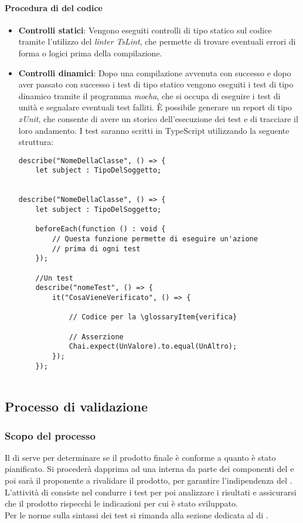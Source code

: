 \paragraph*{Procedura di  del codice}
\begin{itemize}
\item \textbf{Controlli statici}: Vengono eseguiti controlli di tipo statico sul codice tramite l'utilizzo del \textit{linter} \textit{TsLint}, che permette di trovare eventuali errori di forma o logici prima della compilazione.

\item \textbf{Controlli dinamici}: Dopo una compilazione avvenuta con successo e dopo aver passato con successo i test di tipo statico vengono eseguiti i test di tipo dinamico tramite il programma \textit{mocha}, che si occupa di eseguire i test di unità e segnalare eventuali test falliti. È possibile generare un report di tipo \textit{xUnit}, che consente di avere un storico dell'esecuzione dei test e di tracciare il loro andamento. I test saranno scritti in TypeScript utilizzando la seguente struttura:
\begin{verbatim}
describe("NomeDellaClasse", () => {
    let subject : TipoDelSoggetto;


describe("NomeDellaClasse", () => {
    let subject : TipoDelSoggetto;

    beforeEach(function () : void {
        // Questa funzione permette di eseguire un'azione
        // prima di ogni test
    });

    //Un test
    describe("nomeTest", () => {
        it("CosaVieneVerificato", () => {

            // Codice per la \glossaryItem{verifica}

            // Asserzione
            Chai.expect(UnValore).to.equal(UnAltro);
        });
    });
  
\end{verbatim}

\end{itemize}

\subsection{Processo di validazione}
\subsubsection{Scopo del processo}
Il  di  serve per determinare se il prodotto finale è conforme a quanto è stato pianificato. Si procederà dapprima ad una  interna da parte dei componenti del  e poi sarà il proponente a rivalidare il prodotto, per garantire l'indipendenza del . \\
L'attività di  consiste nel condurre i test per poi analizzare i risultati e assicurarsi che il prodotto rispecchi le indicazioni per cui è stato sviluppato. \\
Per le norme sulla sintassi dei test si rimanda alla sezione dedicata al  di .


